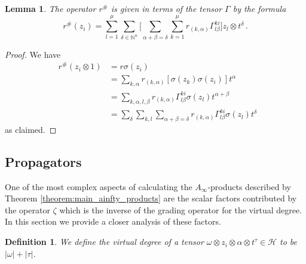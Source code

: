 \documentclass[english,letter paper,12pt,leqno]{article}
\newtheorem{lemma}[theorem]{Lemma}
\theoremstyle{example}
\newtheorem{definition}[theorem]{Definition}
\numberwithin{equation}{section}
\def\HH{\HH}
\def\HH{\mathcal{H}}
\def\be{\begin{equation}}
\def\ee{\end{equation}}
\DeclareMathOperator{\sigmastar}{\sigma_t}
\begin{document}
\begin{lemma}\label{lemma:rsharp_explicit} The operator $r^{\#}$ is given in terms of the tensor $\Gamma$ by the formula
\be
r^{\#}(z_i) = \sum_{l=1}^\mu \sum_{\delta \in \mathbb{N}^n} \Big[ \sum_{\alpha + \beta = \delta } \sum_{k=1}^\mu r_{(k,\alpha)} \Gamma^{ki}_{l\beta} \Big] z_l \otimes t^\delta\,.
\ee
\end{lemma}
\begin{proof}
We have
\begin{align*}
\sigmastar r^{\#}(z_i \otimes 1) &= r \sigma(z_i)\\
&= \sum_{k, \alpha} r_{(k,\alpha)} [ \sigma(z_k) \sigma(z_i) ] t^{\alpha}\\
&= \sum_{k,\alpha,l,\beta} r_{(k,\alpha)} \Gamma^{ki}_{l \beta} \sigma(z_l) t^{\alpha + \beta}\\
&= \sum_\delta \sum_{k,l} \sum_{\alpha + \beta = \delta} r_{(k,\alpha)} \Gamma^{ki}_{l \beta} \sigma(z_l)t^\delta
\end{align*}
as claimed.
\end{proof}

\subsection{Propagators}\label{section:propagator}

One of the most complex aspects of calculating the $A_\infty$-products described by Theorem \ref{theorem:main_ainfty_products} are the scalar factors contributed by the operator $\zeta$ which is the inverse of the grading operator for the virtual degree. In this section we provide a closer analysis of these factors.

\begin{definition} We define the \emph{virtual degree} of a tensor $\omega \otimes z_i \otimes \alpha \otimes t^{\tau} \in \HH$ to be $|\omega| + |\tau|$.
\end{definition}
\end{document}
